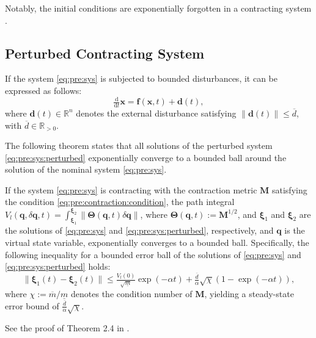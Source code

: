 \documentclass{ifacconf}
\newcommand\R{\mathbb{R}}
\newcommand*{\mv}[1]{\boldsymbol{#1}} %
\newcommand*{\mm}[1]{\boldsymbol{#1}} %
\newcommand*{\norm}[1]{\lVert #1 \rVert} %
\newcommand\der{\mathrm d}
\newcommand*{\ddtt}{
   \tfrac{\der}{\der t}
}
\begin{document}
Notably, the initial conditions are exponentially forgotten in a contracting system \citep{LOHMILLER:1998aa}.

\subsection{Perturbed Contracting System} \label{sec:sub:contraction:perturbed}

If the system \eqref{eq:pre:sys} is subjected to bounded disturbances, it can be expressed as follows:
\begin{equation} \label{eq:pre:sys:perturbed}
   \ddtt\mv{x}
   =
   \mv{f}(\mv{x},t)
   +
   \mv{d}(t)
   , 
\end{equation}
where $\mv{d}(t)\in\R^n$ denotes the external disturbance satisfying $\norm{\mv{d}(t)}\leq \overline{d}$, with $\overline{d}\in\R_{>0}$.

The following theorem states that all solutions of the perturbed system \eqref{eq:pre:sys:perturbed} exponentially converge to a bounded ball around the solution of the nominal system \eqref{eq:pre:sys}.
\begin{thm} \label{thm:contraction:perturbed}
   If the system \eqref{eq:pre:sys} is contracting with the contraction metric $\mm{M}$ satisfying the condition \eqref{eq:pre:contraction:condition}, the path integral $V_l(\mv{q},\delta\mv{q},t)=\int_{\mv{\xi}_1}^{\mv{\xi}_2}\norm{\mm{\Theta}(\mv{q},t)\delta\mv{q}}$, where $\mm{\Theta}(\mv{q},t):=\mm{M}^{1/2}$, and $\mv{\xi}_1$ and $\mv{\xi}_2$ are the solutions of \eqref{eq:pre:sys} and \eqref{eq:pre:sys:perturbed}, respectively, and $\mv{q}$ is the virtual state variable, exponentially converges to a bounded ball. 
   Specifically, the following inequality for a bounded error ball of the solutions of \eqref{eq:pre:sys} and \eqref{eq:pre:sys:perturbed} holds:
   \begin{equation}
      \norm{\mv\xi_1(t)-\mv\xi_2(t)}
      \le
      \tfrac{V_{l}(0)}{\sqrt{\underline{m}}}
      \exp(-\alpha t)
      +
      \tfrac{\overline d}{\alpha}
      \sqrt{\chi}
      (1-\exp(-\alpha t))
      ,
   \end{equation}
   where $\chi:=\overline{m}/\underline{m}$ denotes the condition number of $\mm{M}$, yielding a steady-state error bound of $\tfrac{\overline d}{\alpha}\sqrt{\chi}$.
\end{thm}

\begin{pf}
   See the proof of Theorem 2.4 in \citep{Tsukamoto:2021aa}.
\end{pf}
\end{document}
